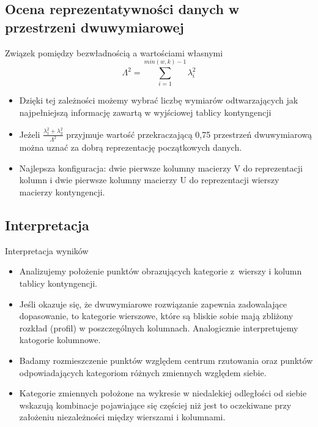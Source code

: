 \documentclass{beamer}
\begin{document}
\subsection{Ocena reprezentatywności danych w przestrzeni dwuwymiarowej}
\begin{frame}{Związek pomiędzy bezwładnością a wartościami własnymi}
  $$\Lambda^2 = \sum_{i=1}^{min(w,k)-1} \lambda^2_i $$
  \begin{itemize}
  \item Dzięki tej zależności możemy wybrać liczbę wymiarów odtwarzających jak najpełniejszą informację zawartą w wyjściowej tablicy kontyngencji
  \item Jeżeli $\frac{\lambda^2_1+\lambda^2_2}{\Lambda^2}$ przyjmuje wartość przekraczającą 0,75 przestrzeń dwuwymiarową można uznać za dobrą reprezentację początkowych danych.
   \item Najlepsza konfiguracja: dwie pierwsze kolumny macierzy V do reprezentacji kolumn i dwie pierwsze kolumny macierzy U do reprezentacji wierszy macierzy kontyngencji.
   \end{itemize}
\end{frame}

\subsection{Interpretacja}
\begin{frame}{Interpretacja wyników}
  \begin{itemize}
  \item Analizujemy położenie punktów obrazujących kategorie z~wierszy i kolumn tablicy kontyngencji.
  \item Jeśli okazuje się, że dwuwymiarowe rozwiązanie zapewnia zadowalające dopasowanie, to kategorie wierszowe, które są bliskie sobie mają zbliżony rozkład (profil) w poszczególnych kolumnach. Analogicznie interpretujemy katogorie kolumnowe.
  \item Badamy rozmieszczenie punktów względem centrum rzutowania oraz punktów odpowiadających kategoriom różnych zmiennych względem siebie.
  \item Kategorie zmiennych położone na wykresie w niedalekiej odległości od siebie wskazują kombinacje pojawiające się częściej niż jest to oczekiwane przy założeniu niezależności między wierszami i kolumnami.
  \end{itemize}
\end{frame}
\end{document}
